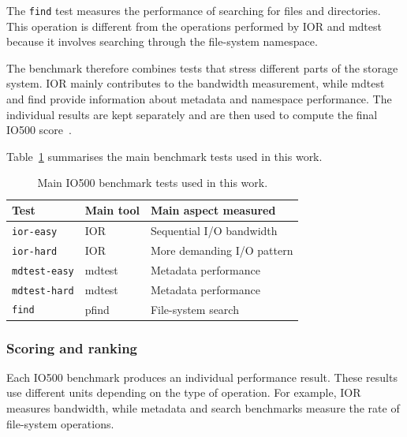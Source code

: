 The \texttt{find} test measures the performance of searching for files
and directories. This operation is different from the operations
performed by IOR and mdtest because it involves searching through the
file-system namespace.

The benchmark therefore combines tests that stress different parts of the
storage system. IOR mainly contributes to the bandwidth measurement,
while mdtest and find provide information about metadata and namespace
performance. The individual results are kept separately and are then
used to compute the final IO500 score~\cite{io500about}.

Table~\ref{tab:io500-tests} summarises the main benchmark tests used in
this work.

\begin{table}[H]
\centering
\caption{Main IO500 benchmark tests used in this work.}
\label{tab:io500-tests}
\begin{tabular}{lll}
    \hline
    \rowcolor{gray!30}
    Test & Main tool & Main aspect measured \\
    \hline

    \texttt{ior-easy}  & IOR    & Sequential I/O bandwidth \\
    \texttt{ior-hard}  & IOR    & More demanding I/O pattern \\
    \texttt{mdtest-easy} & mdtest & Metadata performance \\
    \texttt{mdtest-hard} & mdtest & Metadata performance \\
    \texttt{find} & pfind & File-system search \\

    \hline
\end{tabular}
\end{table}



\subsubsection{Scoring and ranking}

Each IO500 benchmark produces an individual performance result. These
results use different units depending on the type of operation. For
example, IOR measures bandwidth, while metadata and search benchmarks
measure the rate of file-system operations.

